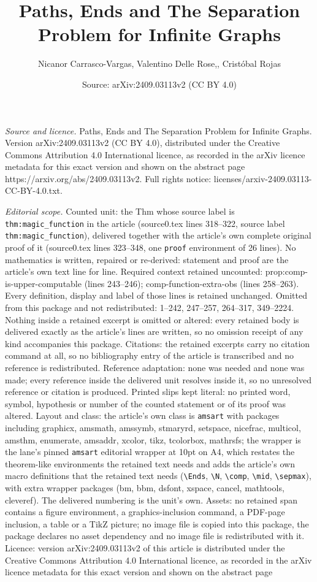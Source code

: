 \documentclass[10pt,a4paper]{amsart}
\title[Paths, Ends and The Separation Problem for Infinite Graphs]{Paths, Ends and The Separation Problem for Infinite Graphs}
\author{Nicanor Carrasco-Vargas, Valentino Delle Rose,, Crist\'obal Rojas}
\date{Source: arXiv:2409.03113v2 (CC BY 4.0)}
\begin{document}
\maketitle

\noindent\emph{Source and licence.} Paths, Ends and The Separation Problem for Infinite Graphs. Version arXiv:2409.03113v2 (CC BY 4.0), distributed under the Creative Commons Attribution 4.0 International licence, as recorded in the arXiv licence metadata for this exact version and shown on the abstract page https://arxiv.org/abs/2409.03113v2. Full rights notice: licenses/arxiv-2409.03113-CC-BY-4.0.txt.\par\smallskip

\noindent\textit{Editorial scope.} Counted unit: the Thm whose source label is \texttt{thm:magic\_function} in the article (source0.tex lines 318--322, source label \texttt{thm:magic\_function}), delivered together with the article's own complete original proof of it (source0.tex lines 323--348, one \texttt{proof} environment of 26 lines). No mathematics is written, repaired or re-derived: statement and proof are the article's own text line for line. Required context retained uncounted: prop:comp-is-upper-computable (lines 243--246); comp-function-extra-obs (lines 258--263). Every definition, display and label of those lines is retained unchanged. Omitted from this package and not redistributed: 1--242, 247--257, 264--317, 349--2224. Nothing inside a retained excerpt is omitted or altered: every retained body is delivered exactly as the article's lines are written, so no omission receipt of any kind accompanies this package. Citations: the retained excerpts carry no citation command at all, so no bibliography entry of the article is transcribed and no reference is redistributed. Reference adaptation: none was needed and none was made; every reference inside the delivered unit resolves inside it, so no unresolved reference or citation is produced. Printed slips kept literal: no printed word, symbol, hypothesis or number of the counted statement or of its proof was altered. Layout and class: the article's own class is \texttt{amsart} with packages including graphicx, amsmath, amssymb, stmaryrd, setspace, nicefrac, multicol, amsthm, enumerate, amsaddr, xcolor, tikz, tcolorbox, mathrsfs; the wrapper is the lane's pinned \texttt{amsart} editorial wrapper at 10pt on A4, which restates the theorem-like environments the retained text needs and adds the article's own macro definitions that the retained text needs (\texttt{\textbackslash Ends}, \texttt{\textbackslash N}, \texttt{\textbackslash comp}, \texttt{\textbackslash mid}, \texttt{\textbackslash sepmax}), with extra wrapper packages (bm, bbm, dsfont, xspace, cancel, mathtools, cleveref). The delivered numbering is the unit's own. Assets: no retained span contains a figure environment, a graphics-inclusion command, a PDF-page inclusion, a table or a TikZ picture; no image file is copied into this package, the package declares no asset dependency and no image file is redistributed with it. Licence: version arXiv:2409.03113v2 of this article is distributed under the Creative Commons Attribution 4.0 International licence, as recorded in the arXiv licence metadata for this exact version and shown on the abstract page 
\end{document}

